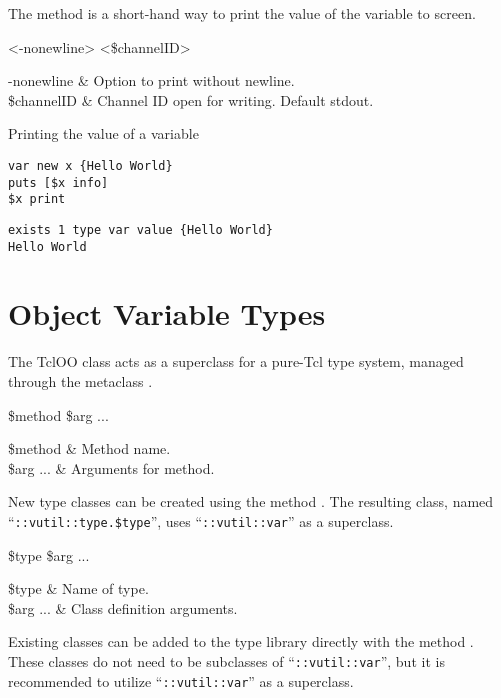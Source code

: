 \documentclass{article}
\begin{document}
The method  is a short-hand way to print the value of the variable to screen.
\begin{syntax}
 <-nonewline> <\$channelID>
\end{syntax}
\begin{args}
-nonewline & Option to print without newline. \\
\$channelID & Channel ID open for writing. Default stdout.
\end{args}
\begin{example}{Printing the value of a variable}
\begin{lstlisting}
var new x {Hello World}
puts [$x info]
$x print
\end{lstlisting}
\tcblower
\begin{lstlisting}
exists 1 type var value {Hello World}
Hello World
\end{lstlisting}
\end{example}


\clearpage
\section{Object Variable Types}
The TclOO class  acts as a superclass for a pure-Tcl type system, managed through the metaclass .
\begin{syntax}
 \$method \$arg ...
\end{syntax}
\begin{args}
\$method & Method name. \\
\$arg ... & Arguments for method.
\end{args}

New type classes can be created using the method .
The resulting class, named ``\texttt{::vutil::type.\$type}'', uses ``\texttt{::vutil::var}'' as a superclass. 
\begin{syntax}
 \$type \$arg ...
\end{syntax}
\begin{args}
\$type & Name of type. \\
\$arg ... & Class definition arguments. 
\end{args}

Existing classes can be added to the type library directly with the method . 
These classes do not need to be subclasses of ``\texttt{::vutil::var}'', but it is recommended to utilize ``\texttt{::vutil::var}'' as a superclass.
\end{document}
